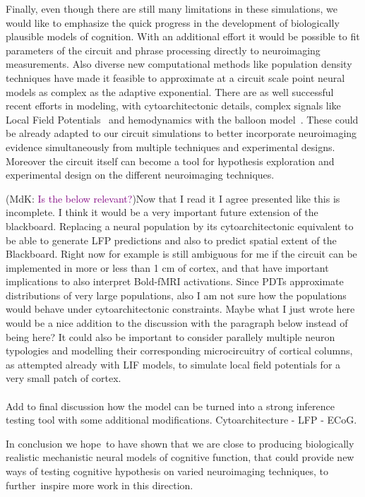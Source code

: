 \documentclass[10pt]{article}
\newcommand{\noteMdK}[2]{(MdK: \textcolor{purple}{#1})}
\newcommand{\notenewMP}[3]{(MP: \textcolor{blue}{#1})}
\begin{document}
Finally, even though there are still many limitations in these simulations, we would like to emphasize the quick progress in the development of biologically plausible models of cognition.
With an additional effort it would be possible to fit parameters of the circuit and phrase processing directly to neuroimaging measurements.
Also diverse new computational methods like population density techniques have made it feasible to approximate at a circuit scale point neural models as complex as the adaptive exponential.
There are as well successful recent efforts in modeling, with cytoarchitectonic details, complex signals like Local Field Potentials~\cite{Mazzoni_2015,Hagen_2015} and hemodynamics with the balloon model~\cite{Buxton_2004}.
These could be already adapted to our circuit simulations to better incorporate neuroimaging evidence simultaneously from multiple techniques and experimental designs.
Moreover the circuit itself can become a tool for hypothesis exploration and experimental design on the different neuroimaging techniques.


\noteMdK{Is the below relevant?} 
\notenewMP{Now that I read it I agree presented like this is incomplete. I think it would be a very important future extension of the blackboard. Replacing a neural population by its cytoarchitectonic equivalent to be able to generate LFP predictions and also to predict spatial extent of the Blackboard. Right now for example is still ambiguous for me if the circuit can be implemented in more or less than 1 cm of cortex, and that have important implications to also interpret Bold-fMRI activations. Since PDTs approximate distributions of very large populations, also I am not sure how the populations would behave under cytoarchitectonic constraints. Maybe what I just wrote here would be a nice addition to the discussion with the paragraph below instead of being here?} 
It could also be important to consider parallely multiple neuron typologies and modelling their corresponding microcircuitry of cortical columns, as attempted already with LIF models, to simulate local field potentials for a very small patch of cortex\cite{Mazzoni_2015,Hagen_2015}.\\~\\


Add to final discussion how the model can be turned into a strong inference testing tool with some additional modifications. Cytoarchitecture - LFP - ECoG.


In conclusion we hope~to have shown that we are close to producing biologically realistic mechanistic neural models of cognitive function, that could provide new ways of testing cognitive hypothesis on varied neuroimaging techniques, to further~inspire more work in this direction.




\end{document}
